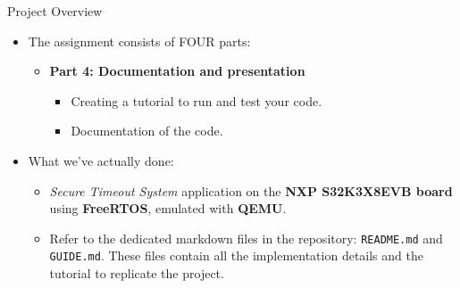 \begin{frame}{Project Overview}
    \begin{itemize}
        \item The assignment consists of FOUR parts:
            \begin{itemize}
                \item \textbf{Part 4: Documentation and presentation}
                    \begin{itemize}
                        \item Creating a tutorial to run and test your code.
                        \item Documentation of the code.
                    \end{itemize}
            \end{itemize}
        \vspace{0.1cm}
        \item What we've actually done:
            \begin{itemize}
                \item \textit{Secure Timeout System} application on the \textbf{NXP S32K3X8EVB board} using \textbf{FreeRTOS}, emulated with \textbf{QEMU}.
                \item Refer to the dedicated markdown files in the repository: \texttt{README.md} and \texttt{GUIDE.md}.
                      These files contain all the implementation details and the tutorial to replicate the project.
            \end{itemize}
    \end{itemize}
\end{frame}

